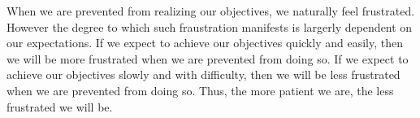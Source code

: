 When we are prevented from realizing our objectives, we naturally feel frustrated. However the degree to which such fraustration manifests is largerly dependent on our expectations. If we expect to achieve our objectives quickly and easily, then we will be more frustrated when we are prevented from doing so. If we expect to achieve our objectives slowly and with difficulty, then we will be less frustrated when we are prevented from doing so. Thus, the more patient we are, the less frustrated we will be.
